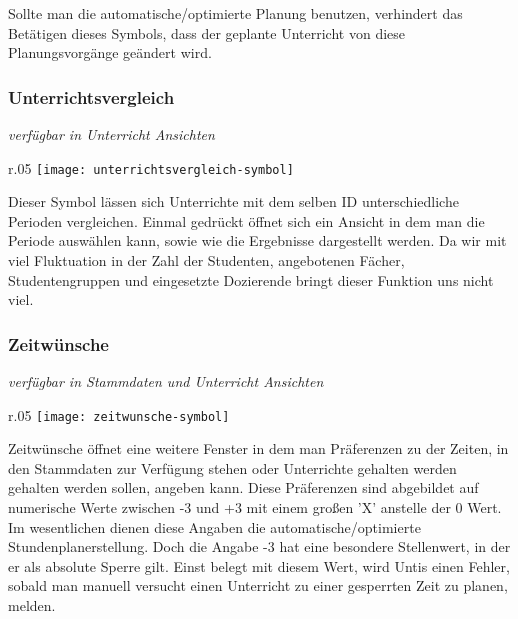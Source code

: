 \noindent
Sollte man die automatische/optimierte Planung benutzen, verhindert das Betätigen dieses Symbols, dass der geplante Unterricht von diese Planungsvorgänge geändert wird.\\

\subsubsection{Unterrichtsvergleich}
{\small\textit{verfügbar in Unterricht Ansichten\\}\par}

\begin{wrapfigure}{r}{.05\textwidth}
	\vspace{-50pt}
	\texttt{[image: unterrichtsvergleich-symbol]}
	\vspace{-35pt}
\end{wrapfigure}

\noindent
Dieser Symbol lässen sich Unterrichte mit dem selben ID unterschiedliche Perioden vergleichen. Einmal gedrückt öffnet sich ein Ansicht in dem man die Periode auswählen kann, sowie wie die Ergebnisse dargestellt werden. Da wir mit viel Fluktuation in der Zahl der Studenten, angebotenen Fächer, Studentengruppen und eingesetzte Dozierende bringt dieser Funktion uns nicht viel.\\

\subsubsection{Zeitwünsche}
{\small\textit{verfügbar in Stammdaten und Unterricht Ansichten\\}\par}

\begin{wrapfigure}{r}{.05\textwidth}
	\vspace{-50pt}
	\texttt{[image: zeitwunsche-symbol]}
	\vspace{-35pt}
\end{wrapfigure}

\noindent
Zeitwünsche öffnet eine weitere Fenster in dem man Präferenzen zu der Zeiten, in den Stammdaten zur Verfügung stehen oder Unterrichte gehalten werden gehalten werden sollen, angeben kann. Diese Präferenzen sind abgebildet auf numerische Werte zwischen -3 und +3 mit einem großen 'X' anstelle der 0 Wert. Im wesentlichen dienen diese Angaben die automatische/optimierte Stundenplanerstellung. Doch die Angabe -3 hat eine besondere Stellenwert, in der er als absolute Sperre gilt. Einst belegt mit diesem Wert, wird Untis einen Fehler, sobald man manuell versucht einen Unterricht zu einer gesperrten Zeit zu planen, melden.\\

